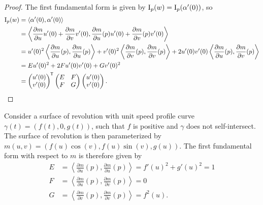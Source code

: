 \begin{proof}
    The first fundamental form is given by $\operatorname{I}_p(w) = \operatorname{I}_p(\alpha'(0))$, so
    \begin{align*}
        \operatorname{I}_p(w) &= \langle \alpha'(0), \alpha'(0) \rangle \\
        &= \left\langle \frac{\partial m}{\partial u}u'(0) + \frac{\partial m}{\partial v}v'(0), \frac{\partial m}{\partial u}(p)u'(0) + \frac{\partial m}{\partial v}(p)v'(0) \right\rangle \\
        &= u'(0)^2\left\langle \frac{\partial m}{\partial u}(p), \frac{\partial m}{\partial u}(p) \right\rangle + v'(0)^2\left\langle \frac{\partial m}{\partial v}(p), \frac{\partial m}{\partial v}(p) \right\rangle + 2u'(0)v'(0)\left\langle \frac{\partial m}{\partial u}(p), \frac{\partial m}{\partial v}(p) \right\rangle \\
        &= Eu'(0)^2 + 2Fu'(0)v'(0) + Gv'(0)^2 \\
        &= \begin{pmatrix}
            u'(0) \\ v'(0)
        \end{pmatrix}^{\mkern-1.5mu\mathsf{T}}\begin{pmatrix}
            E & F \\ F & G
        \end{pmatrix}\begin{pmatrix}
            u'(0) \\ v'(0)
        \end{pmatrix}.
    \end{align*}
\end{proof}

\begin{exmp}
    Consider a surface of revolution with unit speed profile curve $\gamma(t) = (f(t), 0, g(t))$, such that $f$ is positive and $\gamma$ does not self-intersect. The surface of revolution is then parameterized by $m(u, v) = (f(u)\cos(v), f(u)\sin(v), g(u))$. The first fundamental form with respect to $m$ is therefore given by
    \begin{align*}
        E &= \left\langle \frac{\partial m}{\partial u}(p), \frac{\partial m}{\partial u}(p)\right\rangle = f'(u)^2 + g'(u)^2 = 1 \\
        F &= \left\langle \frac{\partial m}{\partial u}(p), \frac{\partial m}{\partial v}(p) \right\rangle = 0 \\
        G &= \left\langle \frac{\partial m}{\partial v}(p), \frac{\partial m}{\partial v}(p)\right\rangle = f^2(u).
    \end{align*}
\end{exmp}

